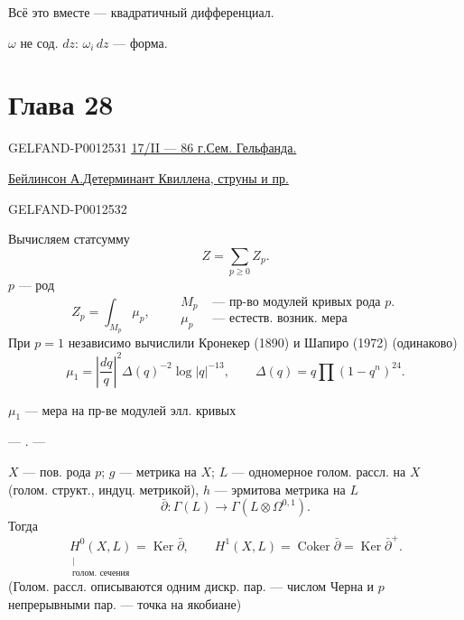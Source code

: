Всё это вместе — квадратичный дифференциал.

$\omega$ не сод. $dz$: $\omega_i\,dz$ — форма.


\clearpage
{}
\section*{Глава 28}
\begin{GelfandAdjacentEvidence}{GELFAND-P001253}{1}
\underline{\underline{17/II — 86 г.}}\qquad\underline{Сем. Гельфанда.}

\underline{\underline{Бейлинсон А.}} \underline{Детерминант Квиллена, струны и пр.}
\end{GelfandAdjacentEvidence}
\begin{GelfandAdjacentEvidence}{GELFAND-P001253}{2}


Вычисляем статсумму
\begin{equation*}
Z=\sum_{p\geq0}Z_p.\tag{1}
\end{equation*}
$p$ — род
\begin{equation*}
Z_p=\int_{M_p}\mu_p,\qquad
\begin{aligned}
M_p&\text{ — пр-во модулей кривых рода }p.\\
\mu_p&\text{ — естеств. возник. мера}
\end{aligned}\tag{2}
\end{equation*}
При $p=1$ независимо вычислили Кронекер (1890) и Шапиро (1972) (одинаково)
\begin{equation*}
\mu_1=\left|\frac{dq}{q}\right|^2\Delta(q)^{-2}\log|q|^{-13},
\qquad \Delta(q)=q\prod(1-q^n)^{24}.\tag{3}
\end{equation*}
\end{GelfandAdjacentEvidence}


$\mu_1$ — мера на пр-ве модулей элл. кривых

\begin{center}— . —\end{center}
$X$ — пов. рода $p$; $g$ — метрика на $X$;
$L$ — одномерное голом. рассл. на $X$
(голом. структ., индуц. метрикой), $h$ — эрмитова метрика на $L$
\begin{equation*}
\bar\partial:\Gamma(L)\longrightarrow\Gamma(L\otimes\Omega^{0,1}).\tag{4}
\end{equation*}
Тогда
\begin{equation*}
\underset{\substack{|\\\text{голом. сечения}}}{H^0(X,L)}
=\operatorname{Ker}\bar\partial,\qquad
H^1(X,L)=\operatorname{Coker}\bar\partial=\operatorname{Ker}\bar\partial^{+}.
\tag{5}
\end{equation*}
(Голом. рассл. описываются одним дискр. пар. — числом Черна и $p$ непрерывными пар. — точка на якобиане)


